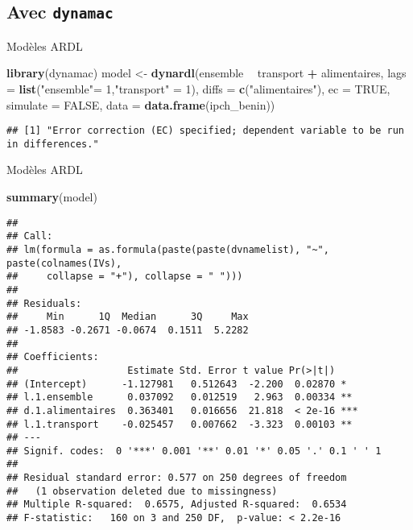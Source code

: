 \documentclass[10pt,xcolor=table,color={dvipsnames,usenames},ignorenonframetext,usepdftitle=false,french]{beamer}
\newenvironment{Shaded}{\begin{snugshade}}{\end{snugshade}}
\newcommand{\DataTypeTok}[1]{\textcolor[rgb]{0.13,0.29,0.53}{#1}}
\newcommand{\DecValTok}[1]{\textcolor[rgb]{0.00,0.00,0.81}{#1}}
\newcommand{\KeywordTok}[1]{\textcolor[rgb]{0.13,0.29,0.53}{\textbf{#1}}}
\newcommand{\NormalTok}[1]{#1}
\newcommand{\OperatorTok}[1]{\textcolor[rgb]{0.81,0.36,0.00}{\textbf{#1}}}
\newcommand{\OtherTok}[1]{\textcolor[rgb]{0.56,0.35,0.01}{#1}}
\newcommand{\StringTok}[1]{\textcolor[rgb]{0.31,0.60,0.02}{#1}}
\begin{document}
\hypertarget{avec-dynamac}{%
\subsection{\texorpdfstring{Avec
\texttt{dynamac}}{Avec dynamac}}\label{avec-dynamac}}

\begin{frame}[fragile]{Modèles ARDL}
\protect\hypertarget{moduxe8les-ardl-4}{}

\begin{Shaded}
\begin{Highlighting}[]
\KeywordTok{library}\NormalTok{(dynamac)}
\NormalTok{model <-}\StringTok{ }\KeywordTok{dynardl}\NormalTok{(ensemble }\OperatorTok{~}\StringTok{ }\NormalTok{transport }\OperatorTok{+}\StringTok{ }\NormalTok{alimentaires,}
        \DataTypeTok{lags =} \KeywordTok{list}\NormalTok{(}\StringTok{"ensemble"}\NormalTok{=}\StringTok{ }\DecValTok{1}\NormalTok{,}\StringTok{"transport"}\NormalTok{ =}\StringTok{ }\DecValTok{1}\NormalTok{),}
        \DataTypeTok{diffs =} \KeywordTok{c}\NormalTok{(}\StringTok{"alimentaires"}\NormalTok{), }
        \DataTypeTok{ec =} \OtherTok{TRUE}\NormalTok{, }\DataTypeTok{simulate =} \OtherTok{FALSE}\NormalTok{,}
        \DataTypeTok{data =} \KeywordTok{data.frame}\NormalTok{(ipch_benin))}
\end{Highlighting}
\end{Shaded}

\begin{verbatim}
## [1] "Error correction (EC) specified; dependent variable to be run in differences."
\end{verbatim}

\end{frame}

\begin{frame}[fragile]{Modèles ARDL}
\protect\hypertarget{moduxe8les-ardl-5}{}

\begin{Shaded}
\begin{Highlighting}[]
\KeywordTok{summary}\NormalTok{(model)}
\end{Highlighting}
\end{Shaded}

\begin{verbatim}
## 
## Call:
## lm(formula = as.formula(paste(paste(dvnamelist), "~", paste(colnames(IVs), 
##     collapse = "+"), collapse = " ")))
## 
## Residuals:
##     Min      1Q  Median      3Q     Max 
## -1.8583 -0.2671 -0.0674  0.1511  5.2282 
## 
## Coefficients:
##                   Estimate Std. Error t value Pr(>|t|)    
## (Intercept)      -1.127981   0.512643  -2.200  0.02870 *  
## l.1.ensemble      0.037092   0.012519   2.963  0.00334 ** 
## d.1.alimentaires  0.363401   0.016656  21.818  < 2e-16 ***
## l.1.transport    -0.025457   0.007662  -3.323  0.00103 ** 
## ---
## Signif. codes:  0 '***' 0.001 '**' 0.01 '*' 0.05 '.' 0.1 ' ' 1
## 
## Residual standard error: 0.577 on 250 degrees of freedom
##   (1 observation deleted due to missingness)
## Multiple R-squared:  0.6575, Adjusted R-squared:  0.6534 
## F-statistic:   160 on 3 and 250 DF,  p-value: < 2.2e-16
\end{verbatim}

\end{frame}
\end{document}
